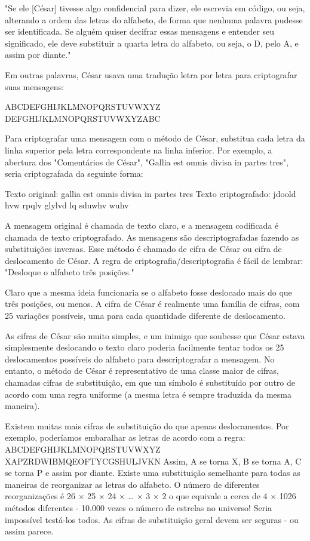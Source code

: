 \documentclass{book}
\begin{document}
%
"Se ele [César] tivesse algo confidencial para dizer, ele escrevia em código, ou seja, alterando a ordem das letras do alfabeto, de forma que nenhuma palavra pudesse ser identificada. Se alguém quiser decifrar essas mensagens e entender seu significado, ele deve substituir a quarta letra do alfabeto, ou seja, o D, pelo A, e assim por diante."
%

Em outras palavras, César usava uma tradução letra por letra para criptografar suas mensagens:

%
ABCDEFGHIJKLMNOPQRSTUVWXYZ
DEFGHIJKLMNOPQRSTUVWXYZABC
%

Para criptografar uma mensagem com o método de César, substitua cada letra da linha superior pela letra correspondente na linha inferior. Por exemplo, a abertura dos "Comentários de César", "Gallia est omnis divisa in partes tres", seria criptografada da seguinte forma:

%
Texto original: gallia est omnis divisa in partes tres
Texto criptografado: jdoold hvw rpqlv glylvd lq sduwhv wuhv
%

A mensagem original é chamada de texto claro, e a mensagem codificada é chamada de texto criptografado. As mensagens são descriptografadas fazendo as substituições inversas. Esse método é chamado de cifra de César ou cifra de deslocamento de César. A regra de criptografia/descriptografia é fácil de lembrar: "Desloque o alfabeto três posições."

Claro que a mesma ideia funcionaria se o alfabeto fosse deslocado mais do que três posições, ou menos. A cifra de César é realmente uma família de cifras, com 25 variações possíveis, uma para cada quantidade diferente de deslocamento.

As cifras de César são muito simples, e um inimigo que soubesse que César estava simplesmente deslocando o texto claro poderia facilmente tentar todos os 25 deslocamentos possíveis do alfabeto para descriptografar a mensagem. No entanto, o método de César é representativo de uma classe maior de cifras, chamadas cifras de substituição, em que um símbolo é substituído por outro de acordo com uma regra uniforme (a mesma letra é sempre traduzida da mesma maneira).

Existem muitas mais cifras de substituição do que apenas deslocamentos. Por exemplo, poderíamos embaralhar as letras de acordo com a regra:
%
ABCDEFGHIJKLMNOPQRSTUVWXYZ
XAPZRDWIBMQEOFTYCGSHULJVKN
%
Assim, A se torna X, B se torna A, C se torna P e assim por diante. Existe uma substituição semelhante para todas as maneiras de reorganizar as letras do alfabeto. O número de diferentes reorganizações é
%
26 × 25 × 24 × … × 3 × 2
%
o que equivale a cerca de 4 × 1026 métodos diferentes - 10.000 vezes o número de estrelas no universo! Seria impossível testá-los todos. As cifras de substituição geral devem ser seguras - ou assim parece.
\end{document}
